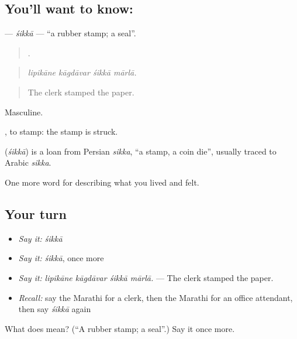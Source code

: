 \subsection*{You'll want to know: }
\textbf{} — \emph{śikkā} — \textquotedblleft{}a rubber stamp; a seal\textquotedblright{}.

\begin{quote}
   .
\end{quote}

\begin{quote}
\emph{lipikāne kāgdāvar śikkā mārlā.}
\end{quote}

\begin{quote}
The clerk stamped the paper.
\end{quote}

Masculine.

 , to stamp: the stamp is struck.

\begin{cousinweb}
\textbf{} (\emph{śikkā}) is a loan from Persian \emph{sikka}, \textquotedblleft{}a stamp, a coin die\textquotedblright{}, usually traced to Arabic \emph{sikka}.
\end{cousinweb}

\begin{grammarlens}[title={What you've built}]
One more word for describing what you lived and felt.
\end{grammarlens}

\subsection*{Your turn}
\begin{itemize}
\raggedright
  \item \emph{Say it:} \emph{śikkā}
  \item \emph{Say it:} \emph{śikkā}, once more
  \item \emph{Say it:} \emph{lipikāne kāgdāvar śikkā mārlā.} — The clerk stamped the paper.
  \item \emph{Recall:} say the Marathi for a clerk, then the Marathi for an office attendant, then say \emph{śikkā} again
\end{itemize}

\begin{tcolorbox}[breakable,colback=teal!4,colframe=teal!35!black,title={Before you move on}]
What does  mean? (\textquotedblleft{}A rubber stamp; a seal\textquotedblright{}.) Say it once more.
\end{tcolorbox}
